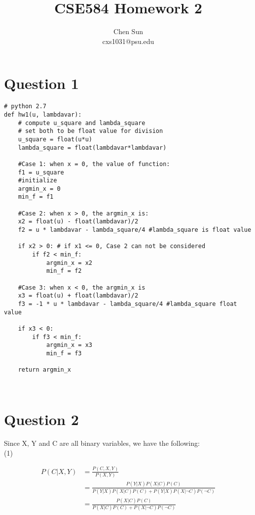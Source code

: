 \documentclass{amsart}
\begin{document}
\title{CSE584 Homework 2}
\author{Chen Sun\\cxs1031@psu.edu}
\maketitle


\section{Question 1}\label{sec:q1}
\begin{lstlisting}
# python 2.7
def hw1(u, lambdavar):
	# compute u_square and lambda_square
	# set both to be float value for division
	u_square = float(u*u)
	lambda_square = float(lambdavar*lambdavar)
	
	#Case 1: when x = 0, the value of function:
	f1 = u_square
	#initialize 
	argmin_x = 0
	min_f = f1
	
	#Case 2: when x > 0, the argmin_x is:
	x2 = float(u) - float(lambdavar)/2
	f2 = u * lambdavar - lambda_square/4 #lambda_square is float value
	
	if x2 > 0: # if x1 <= 0, Case 2 can not be considered
		if f2 < min_f:
			argmin_x = x2
			min_f = f2
	
	#Case 3: when x < 0, the argmin_x is 
	x3 = float(u) + float(lambdavar)/2
	f3 = -1 * u * lambdavar - lambda_square/4 #lambda_square float value
	
	if x3 < 0:
		if f3 < min_f:
			argmin_x = x3
			min_f = f3
	
	return argmin_x

 
\end{lstlisting}

\section{Question 2}\label{sec:q2}

Since X, Y and C are all binary variables, we have the following:\\

(1)

\begin{align*}
	P(C|X,Y) &= \frac{P(C,X,Y)}{P(X,Y)} \\
			&=\frac{P(Y|X)P(X|C)P(C)}{P(Y|X)P(X|C)P(C) + P(Y|X)P(X|\neg C)P(\neg C)}\\
			&=\frac{P(X|C)P(C)}{P(X|C)P(C) + P(X|\neg C)P(\neg C)}
\end{align*}
	
\end{document}
